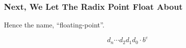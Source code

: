 \begin{frame}

\frametitle{Next, We Let The Radix Point Float About}

\begin{center}

Hence the name, ``floating-point''.

\end{center}

\[
d_n \cdots d_2 d_1 d_0 \cdot b^e
\]

\end{frame}

